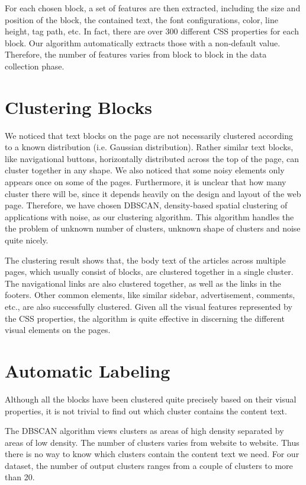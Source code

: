 \documentclass{acm_proc_article-sp}
\begin{document}
For each chosen block, a set of features are then extracted, including the size and position of the block, the contained text, the font configurations, color, line height, tag path, etc. In fact, there are over 300 different CSS properties for each block. Our algorithm automatically extracts those with a non-default value. Therefore, the number of features varies from block to block in the data collection phase.

\section{Clustering Blocks}

We noticed that text blocks on the page are not necessarily clustered according to a known distribution (i.e. Gaussian distribution). Rather similar text blocks, like navigational buttons, horizontally distributed across the top of the page, can cluster together in any shape. We also noticed that some noisy elements only appears once on some of the pages. Furthermore, it is unclear that how many cluster there will be, since it depends heavily on the design and layout of the web page. Therefore, we have chosen DBSCAN\cite{ester:dbscan}, density-based spatial clustering of applications with noise, as our clustering algorithm. This algorithm handles the the problem of unknown number of clusters, unknown shape of clusters and noise quite nicely.

The clustering result shows that, the body text of the articles across multiple pages, which usually consist of blocks, are clustered together in a single cluster. The navigational links are also clustered together, as well as the links in the footers. Other common elements, like similar sidebar, advertisement, comments, etc., are also successfully clustered. Given all the visual features represented by the CSS properties, the algorithm is quite effective in discerning the different visual elements on the pages.

\section{Automatic Labeling}

Although all the blocks have been clustered quite precisely based on their visual properties, it is not trivial to find out which cluster contains the content text.

The DBSCAN algorithm views clusters as areas of high density separated by areas of low density. The number of clusters varies from website to website. Thus there is no way to know which clusters contain the content text we need. For our dataset, the number of output clusters ranges from a couple of clusters to more than 20.
\end{document}
